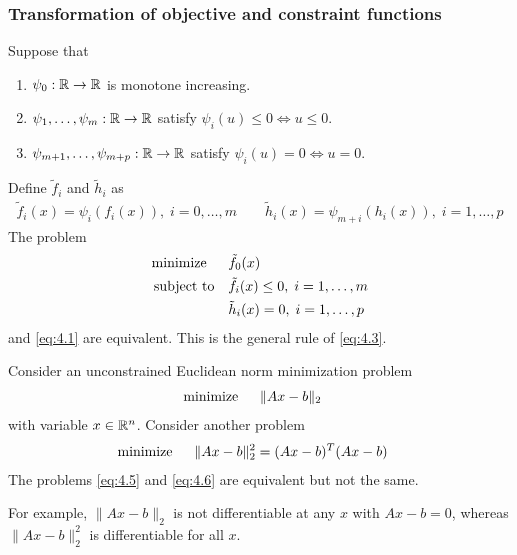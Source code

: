 \subsubsection{Transformation of objective and constraint functions}
Suppose that
\begin{enumerate}
  \item $\psi_0:\mathbb{R}\rightarrow\mathbb{R}$ is monotone increasing.
  \item $\psi_1,\dots,\psi_m:\mathbb{R}\rightarrow\mathbb{R}$ satisfy $\psi_i(u)\le 0\Leftrightarrow u\le 0$.
  \item $\psi_{m+1},\dots,\psi_{m+p}:\mathbb{R}\rightarrow\mathbb{R}$ satisfy $\psi_i(u)=0\Leftrightarrow u=0$.
\end{enumerate}
Define $\tilde{f}_i$ and $\tilde{h}_i$ as
\begin{align*}
  \tilde{f}_i(x)=\psi_i(f_i(x)),\;i=0,\dots,m\quad\quad\tilde{h}_i(x)=\psi_{m+i}(h_i(x)),\;i=1,\dots,p
\end{align*}
The problem
\begin{align*}
  \text{minimize\;\;}\quad& \tilde{f}_0(x)\\
  \text{subject to}  \quad& \tilde{f}_i(x)\le 0,\;i=1,\dots,m\\
                          & \tilde{h}_i(x) =  0,\;i=1,\dots,p
\end{align*}
and \eqref{eq:4.1} are equivalent. This is the general rule of \eqref{eq:4.3}.
\begin{example}
  Consider an unconstrained Euclidean norm minimization problem
  \begin{align}
    \text{minimize\;\;}\quad& \|Ax-b\|_2\label{eq:4.5}
  \end{align}
  with variable $x\in\mathbb{R}^n$. Consider another problem
  \begin{align}
    \text{minimize\;\;}\quad& \|Ax-b\|_2^2=(Ax-b)^T(Ax-b)\label{eq:4.6}
  \end{align}
  The problems \eqref{eq:4.5} and \eqref{eq:4.6} are equivalent but not the same.\par
  For example, $\|Ax-b\|_2$ is not differentiable at any $x$ with $Ax-b=0$, whereas $\|Ax-b\|_2^2$ is differentiable for all $x$.
\end{example}
